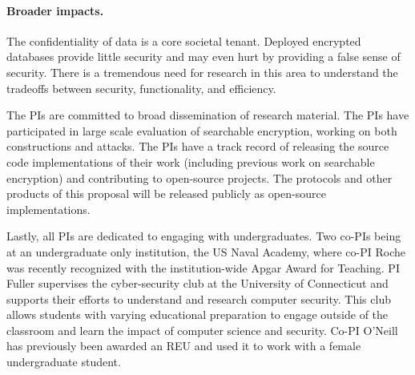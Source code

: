 \paragraph{Broader impacts.}
The confidentiality of data is a core societal tenant.  Deployed encrypted
databases provide little security and may even hurt by providing a false sense
of security.  There is a tremendous need for research in this area to
understand the tradeoffs between security, functionality, and efficiency.

The PIs are committed to broad dissemination of research material.  The PIs
have participated in large scale evaluation of searchable encryption, working
on both constructions and attacks. The PIs have a track record of
releasing the source code implementations of their work (including
previous work on searchable encryption) and contributing
to open-source projects.
The protocols and other products of this proposal will be released
publicly as open-source implementations.

Lastly, all PIs are
dedicated to engaging with undergraduates. Two co-PIs being at an
undergraduate only institution, the US Naval Academy, where co-PI Roche
was recently recognized with the institution-wide Apgar Award for
Teaching.  PI Fuller supervises the cyber-security club at the
University of Connecticut and supports their efforts to understand and
research computer security.  This club allows students with varying
educational preparation to engage outside of the classroom and learn the
impact of computer science and security.  Co-PI O'Neill has previously
been awarded an REU and used it to  work with a female undergraduate
student.




